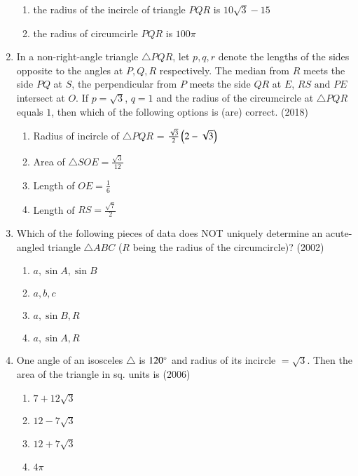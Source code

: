 \begin{enumerate}[label=\thesubsection.\arabic*,ref=\thesubsection.\theenumi]
\begin{enumerate}
    	\item the radius of the incircle of triangle $PQR$ is $10\sqrt{3}-15$
    	\item the radius of circumcirle $PQR$ is $100\pi$
    \end{enumerate}
    \item In a non-right-angle triangle $\triangle PQR$, let $p,q,r$ denote the lengths of the sides opposite to the angles at ${P},{Q},{R}$ respectively. The median from ${R}$ meets the side $PQ$ at ${S}$, the perpendicular from ${P}$ meets the side $QR$ at ${E}$, $RS \text{ and } PE$ intersect at ${O}$. If $p = \sqrt{3}$, $q = 1$ and the radius of the circumcircle at $\triangle PQR$ equals $1$, then which of the following options is (are) correct.
    \hfill{(2018)}
    \begin{enumerate}
    	\item Radius of incircle of $\triangle PQR$ = $\frac{\sqrt{3}}{2}\left(2-\sqrt{3}\right)$
    	\item Area of $\triangle SOE = \frac{\sqrt{3}}{12}$
    	\item Length of $OE = \frac{1}{6}$
    	\item Length of $RS = \frac{\sqrt{7}}{2}$
    \end{enumerate}
\item Which of the following pieces of data does NOT uniquely determine an acute-angled triangle $\triangle ABC$ (${R}$ being the radius of the circumcircle)?
\hfill (2002)
		\begin{multicols}{4}
\begin{enumerate}
\item $a, \sin A, \sin B$
\item $a, b, c$
\item $a, \sin B, R$
\item $a, \sin A, R$
\end{enumerate}
    \end{multicols}
\item One angle of an isosceles $\triangle$ is $120\degree$ and radius of its incircle $= \sqrt{3}$. Then the area of the triangle in sq. units is 
\hfill (2006)
		\begin{multicols}{4}
\begin{enumerate}
\item $7+12\sqrt{3}$
\item $12-7\sqrt{3}$
\item $12+7\sqrt{3}$
\item $4\pi$
\end{enumerate}

\end{multicols}
\end{enumerate}
